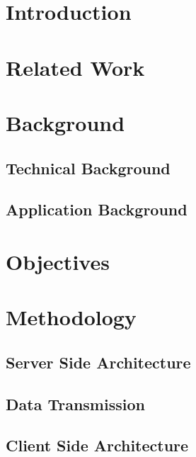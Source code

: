 \documentclass[12pt]{asu}
\begin{document}


	\chapter[Introduction]{\centering Introduction}
    	 \label{intro}

\chapter[Related Work]{\centering Related Work} \label{relwork}
			 \label{relwork}

	\chapter[Background]{\centering Background} \label{bkgrnd}
				\section{Technical Background}
				 \label{bkgrnd_technical}
				\section{Application Background}
				 \label{bkgrnd_application}

	\chapter[Objectives]{\centering Objectives} \label{objectives}
	 \label{objectives}

	\chapter[Methodology]{\centering Methodology} \label{methods}
	 \label{methods_intro}
		\section{Server Side Architecture}
		 \label{methods_server_side}
		\section{Data Transmission}
		 \label{methods_data_transmission}
		\section{Client Side Architecture}
		 \label{methods_client_side}
\end{document}
